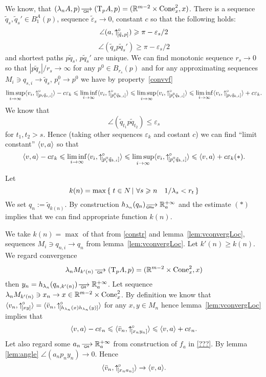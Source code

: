 \documentclass[a4paper,10pt]{article}
\begin{document}
We know, that $(\lambda_n A, p)\GHto (\T_p A, p)=(\RR^{m-2}\times \Cone_x^2,x)$.
There is a sequence $\tilde q_s, \tilde q_s' \in B_1^A(p)$,
 sequence $\tilde \varepsilon_s\to 0$, constant $c$ so that the following holds:
$$\angle(a,{\uparrow}_{\hskip-0.15em[{\tilde q_s}{p}]}^{\hspace{-0.1ex}\circ})\geqslant\pi- \varepsilon_s/2$$
 $$\angle(\tilde q_s p\tilde q_s')\ge\pi- \varepsilon_s/2$$
and shortest paths $p\tilde q_s$, $p\tilde q_s'$ are unique.
We can find monotonic sequence $r_s\to 0$ so that $|p\tilde q_s|/r_s\to\infty$
for any $p^0\in B_{r_s}(p)$
and for any approximating sequences
$M_i\ni q_{s,i}\to \tilde q_s$, $p^0_i\to p^0$ we have by property~\ref{convvf}
$$\limsup_{i\to\infty}  \langle v_i,{\uparrow}_{\hskip-0.15em[{p_i}{\tilde q_{s,i}}]}^{\hspace{-0.1ex}\circ}\rangle -c\varepsilon_k\leqslant
\liminf_{i\to\infty}  \langle v_i,{\uparrow}_{\hskip-0.15em[{p^0_i}{\tilde q_{k,i}}]}^{\hspace{-0.1ex}\circ}\rangle\leqslant\limsup_{i\to\infty}  \langle v_i,{\uparrow}_{\hskip-0.15em[{p^0_i}{\tilde q_{k,i}}]}^{\hspace{-0.1ex}\circ}\rangle
\leqslant\liminf_{i\to\infty}  \langle v_i,{\uparrow}_{\hskip-0.15em[{p_i}{\tilde q_{k,i}}]}^{\hspace{-0.1ex}\circ}\rangle +c\varepsilon_k .
$$
We know that $$\angle(\tilde q_{t_1}p\tilde q_{t_2})\le\varepsilon_s$$ for $t_1, t_2>s$.
Hence (taking other sequences $\varepsilon_k$ and costant $c$)
we can find ``limit constant'' $\langle v,a\rangle$ so that
 $$\langle v,a\rangle-c\varepsilon_k\leqslant
\liminf_{i\to\infty}
\langle v_i,{\uparrow}_{\hskip-0.15em[{p^0_i}{\tilde q_{k,i}}]}^{\hspace{-0.1ex}\circ}\rangle\leqslant\limsup_{i\to\infty}  \langle v_i,{\uparrow}_{\hskip-0.15em[{p^0_i}{\tilde q_{k,i}}]}^{\hspace{-0.1ex}\circ}\rangle
\leqslant\langle v,a\rangle +c\varepsilon_k(*).$$

Let
$$k(n)=\max\set{t\in N}{\forall s\ge n\quad 1/\lambda_s<r_t}$$
We set $q_n:=\tilde q_{k(n)}$.
By construction $h_{\lambda_n}( q_n)\GHwto\RR_a^{+\infty}$
and the estimate $(*)$ implies that we can find appropriate function $k(n)$.
\qeds


We take $k(n)=\max$ of that from \ref{constr}
and lemma~\ref{lem:vconvergLoc},
sequences
$M_i\ni q_{n,i}\to q_n$ from  lemma~\ref{lem:vconvergLoc}.
Let $k'(n)\ge k(n)$.
We regard convergence
$$\lambda_n M_{k'(n)}\GHto (\T_p A, p)=(\RR^{m-2}\times \Cone_x^2,x)$$
then $y_n=h_{\lambda_n}(q_{n, k'(n)})\GHto \R_a^{+\infty} $.
Let sequence $\lambda_n M_{k'(n)}\ni x_n\to x\in \mathbb{R}^{m-2}\times \operatorname{Cone}_x^2$.
By definition we know that
 $\langle v_n,{\uparrow}_{\hskip-0.15em[{x}{y}]}^{\hspace{-0.1ex}\circ}\rangle=\langle\bar v_n, {\uparrow}_{\hskip-0.15em[{h_{\lambda_n}(x)}{h_{\lambda_n}(y )}]}^{\hspace{-0.1ex}\circ}\rangle$
for any $x,y\in M_n$
hence lemma~\ref{lem:vconvergLoc} implies that
$$\langle v,a\rangle-c\varepsilon_n\leqslant\langle\bar v_n,{\uparrow}_{\hskip-0.15em[{x_n}{y_n}]}^{\hspace{-0.1ex}\circ}\rangle\leqslant\langle v,a\rangle+c\varepsilon_n.$$
Let also regard some
$a_n\GHto \R_a^{+\infty} $ from construction of $f_a$ in \ref{???}.
By lemma \ref{lem:angle}
$\angle (a_n p_n y_n)\to 0$.
Hence
$$\langle\bar v_n,{\uparrow}_{\hskip-0.15em[{x_n}{a_n}]}^{\hspace{-0.1ex}\circ}\rangle\to\langle v,a\rangle.$$
\qeds
\end{document}
